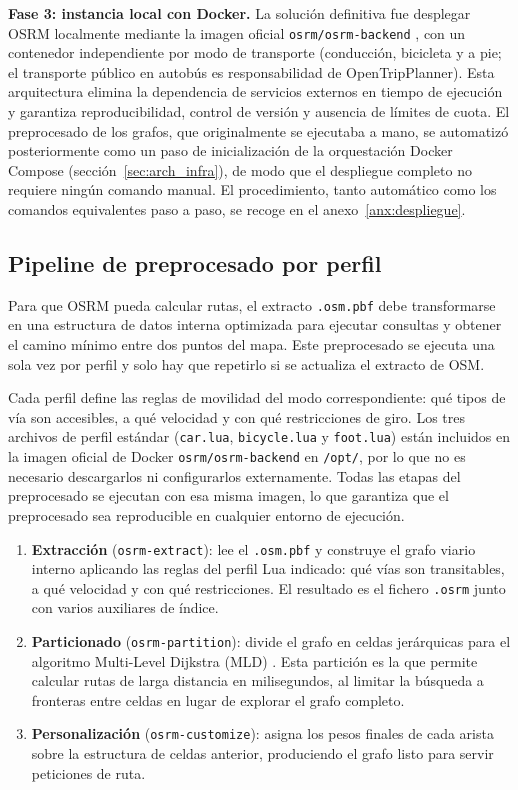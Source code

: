 \textbf{Fase 3: instancia local con Docker.} La solución definitiva fue desplegar OSRM localmente mediante la imagen oficial \texttt{osrm/osrm-backend} \cite{OSRMGitHub}, con un contenedor independiente por modo de transporte (conducción, bicicleta y a pie; el transporte público en autobús es responsabilidad de OpenTripPlanner). Esta arquitectura elimina la dependencia de servicios externos en tiempo de ejecución y garantiza reproducibilidad, control de versión y ausencia de límites de cuota. El preprocesado de los grafos, que originalmente se ejecutaba a mano, se automatizó posteriormente como un paso de inicialización de la orquestación Docker Compose (sección~\ref{sec:arch_infra}), de modo que el despliegue completo no requiere ningún comando manual. El procedimiento, tanto automático como los comandos equivalentes paso a paso, se recoge en el anexo~\ref{anx:despliegue}.


\subsection{Pipeline de preprocesado por perfil}
\label{subsec:impl_osrm_pipeline}

Para que OSRM pueda calcular rutas, el extracto \texttt{.osm.pbf} debe transformarse en una estructura de datos interna optimizada para ejecutar consultas y obtener el camino mínimo entre dos puntos del mapa. Este preprocesado se ejecuta una sola vez por perfil y solo hay que repetirlo si se actualiza el extracto de OSM.

Cada perfil define las reglas de movilidad del modo correspondiente: qué tipos de vía son accesibles, a qué velocidad y con qué restricciones de giro. Los tres archivos de perfil estándar (\texttt{car.lua}, \texttt{bicycle.lua} y \texttt{foot.lua}) están incluidos en la imagen oficial de Docker \texttt{osrm/osrm-backend} en \texttt{/opt/}, por lo que no es necesario descargarlos ni configurarlos externamente. Todas las etapas del preprocesado se ejecutan con esa misma imagen, lo que garantiza que el preprocesado sea reproducible en cualquier entorno de ejecución.

\begin{enumerate}
  \item \textbf{Extracción} (\texttt{osrm-extract}): lee el \texttt{.osm.pbf} y construye el grafo viario interno aplicando las reglas del perfil Lua indicado: qué vías son transitables, a qué velocidad y con qué restricciones. El resultado es el fichero \texttt{.osrm} junto con varios auxiliares de índice.
  \item \textbf{Particionado} (\texttt{osrm-partition}): divide el grafo en celdas jerárquicas para el algoritmo Multi-Level Dijkstra (MLD) \cite{Geisberger2008CH}. Esta partición es la que permite calcular rutas de larga distancia en milisegundos, al limitar la búsqueda a fronteras entre celdas en lugar de explorar el grafo completo.
  \item \textbf{Personalización} (\texttt{osrm-customize}): asigna los pesos finales de cada arista sobre la estructura de celdas anterior, produciendo el grafo listo para servir peticiones de ruta.
\end{enumerate}

